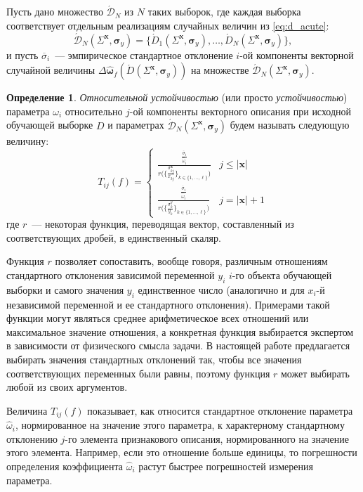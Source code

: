 \documentclass[11pt,a4paper]{article}
\theoremstyle{definition}
\newtheorem{defin}{Определение}
\begin{document}
Пусть дано множество $\acute{\mathcal{D}}_N$ из $N$ таких выборок, где каждая выборка
соответствует отдельным реализациям случайных величин из \eqref{eq:d_acute}:
\[
  \acute{\mathcal{D}}_N (\Sigma^{\mathbf{x}}, \boldsymbol{\sigma}_y) = \{ \acute{D}_1 (\Sigma^{\mathbf{x}}, \boldsymbol{\sigma}_y), \dots, \acute{D}_N (\Sigma^{\mathbf{x}}, \boldsymbol{\sigma}_y) \},
\]
и пусть $\overline{\sigma}_i$~--- эмпирическое стандартное отклонение $i$-ой компоненты
векторной случайной величины
$\Delta\hat{\boldsymbol{\omega}}_f(\acute{D} (\Sigma^{\mathbf{x}}, \boldsymbol{\sigma}_y) )$
на множестве $\acute{\mathcal{D}}_N (\Sigma^{\mathbf{x}}, \boldsymbol{\sigma}_y)$.
\begin{defin}
\emph{Относительной устойчивостью} (или просто \emph{устойчивостью}) параметра
$\omega_i$ относительно $j$-ой компоненты векторного описания при исходной
обучающей выборке $D$ и параметрах $\acute{\mathcal{D}}_N (\Sigma^{\mathbf{x}}, \boldsymbol{\sigma}_y)$
будем называть следующую величину:
\begin{equation}
  T_{ij}(f) =
	\begin{cases}
	  \displaystyle \frac{\frac{\overline{\sigma}_i}{\hat{\omega}_i}}{r\big(\{ \frac{\sigma_{kj}^{\mathbf{x}}}{x_{kj}} \}_{k \in \{ 1, \dots, \ell \}}\big)} & j \leq |\mathbf{x}| \\
	  \displaystyle \frac{\frac{\overline{\sigma}_i}{\hat{\omega}_i}}{r\big(\{ \frac{\sigma_{k}^{y}}{y_k} \}_{k \in \{ 1, \dots, \ell \}}\big)} & j = |\mathbf{x}| + 1
	\end{cases}
  \label{eq:t_rel}
\end{equation}
где $r$~--- некоторая функция, переводящая вектор, составленный из соответствующих
дробей, в единственный скаляр.
\end{defin}

Функция $r$ позволяет сопоставить, вообще говоря, различным отношениям стандартного
отклонения зависимой переменной $y_i$ $i$-го объекта обучающей выборки и самого значения $y_i$
единственное число (аналогично и для $x_i$-й независимой переменной и ее стандартного отклонения).
Примерами такой функции могут являться среднее арифметическое
всех отношений или максимальное значение отношения, а конкретная функция выбирается
экспертом в зависимости от физического смысла задачи.
В настоящей работе предлагается выбирать значения стандартных отклонений так, чтобы
все значения соответствующих переменных были равны, поэтому функция $r$ может выбирать
любой из своих аргументов.

Величина $T_{ij}(f)$ показывает, как относится стандартное отклонение
параметра $\hat{\omega}_i$, нормированное на значение этого параметра, к характерному стандартному
отклонению $j$-го элемента признакового описания, нормированного на значение этого
элемента. Например, если это отношение больше единицы, то погрешности определения коэффициента
$\hat{\omega}_i$ растут быстрее погрешностей измерения параметра.
\end{document}
